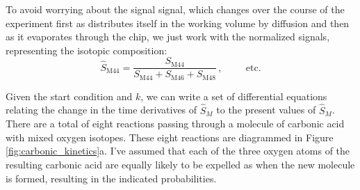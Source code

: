 To avoid worrying about the signal  signal, which changes over the course of the experiment first as  distributes itself in the working volume by diffusion and then as it evaporates through the chip, we just work with the normalized signals, representing the isotopic composition:
\begin{equation}
\hat{S}_\text{M44} = \frac{S_\text{M44}}{S_\text{M44} + S_\text{M46} + S_\text{M48}}\,,\hspace{1cm}\text{etc.}
\end{equation}

Given the start condition and $k$, we can write a set of differential equations relating the change in the time derivatives of $\hat{S}_M$ to the present values of $\hat{S}_M$. There are a total of eight reactions passing through a molecule of carbonic acid with mixed oxygen isotopes. These eight reactions are diagrammed in Figure \ref{fig:carbonic_kinetics}a. I've assumed that each of the three oxygen atoms of the resulting carbonic acid are equally likely to be expelled as  when the new  molecule is formed, resulting in the indicated probabilities.


